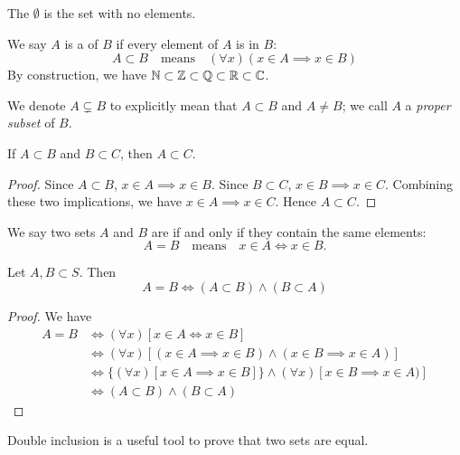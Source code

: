 The  $\emptyset$ is the set with no elements.

We say $A$ is a  of $B$ if every element of $A$ is in $B$:
\[A\subset B\quad\text{means}\quad(\forall x)(x\in A \implies x\in B)\]
By construction, we have $\mathbb N\subset\mathbb Z\subset\mathbb Q\subset\mathbb R\subset\mathbb C$.

We denote $A\subsetneq B$ to explicitly mean that $A\subset B$ and $A\neq B$; we call $A$ a \emph{proper subset} of $B$.

\begin{lemma}
If $A\subset B$ and $B\subset C$, then $A\subset C$.
\end{lemma}

\begin{proof}
Since $A\subset B$, $x\in A\implies x\in B$. 
Since $B \subset C$, $x\in B\implies x\in C$. 
Combining these two implications, we have $x\in A\implies x\in C$.
Hence $A\subset C$.
\end{proof}

We say two sets $A$ and $B$ are  if and only if they contain the same elements:
\[A=B\quad\text{means}\quad x\in A\iff x\in B.\]

\begin{lemma}
Let $A,B\subset S$. Then
\[A=B\iff (A\subset B)\land(B\subset A)\]
\end{lemma}

\begin{proof}
We have 
\begin{align*}
A = B &\iff (\forall x)[x \in A \iff x \in B] \\
&\iff (\forall x)[(x \in A \implies x \in B) \land (x \in B \implies x \in A)] \\
&\iff \{(\forall x)[x \in A \implies x \in B]\} \land {(\forall x)[x \in B \implies x \in A)]} \\
&\iff (A \subset B) \land (B \subset A)
\end{align*}
\end{proof}

\begin{remark}
Double inclusion is a useful tool to prove that two sets are equal.
\end{remark}

